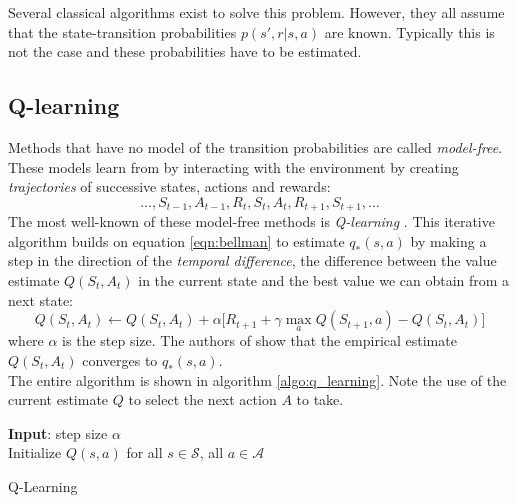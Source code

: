 Several classical algorithms exist to solve this problem. However, they all assume that the state-transition probabilities $p(s', r | s, a)$ are known. Typically this is not the case and these probabilities have to be estimated. 
\subsection{Q-learning}
\label{sec:intro_q_learning}
Methods that have no model of the transition probabilities are called \emph{model-free}. These models learn from by interacting with the environment by creating \emph{trajectories} of successive states, actions and rewards:
$$
\ldots, S_{t-1}, A_{t-1}, R_t, S_t, A_t, R_{t+1}, S_{t+1}, \ldots
$$
The most well-known of these  model-free methods is \emph{Q-learning} \cite{watkins1989learning}. This iterative algorithm builds on equation \ref{eqn:bellman} to estimate $q_{*}(s,a)$ by making a step in the direction of the \emph{temporal difference}, the difference between the value estimate $Q(S_t, A_t)$ in the current state and the best value we can obtain from a next state:
\begin{equation}
    Q(S_t, A_t) \leftarrow Q(S_t, A_t) + \alpha \big[R_{t+1} + \gamma \max_{a} Q(S_{t+1}, a) - Q(S_t, A_t) \big]
    \label{eqn:q_learning}
\end{equation}
where $\alpha$ is the step size. The authors of \cite{watkins1992q} show that the empirical estimate $Q(S_t, A_t)$ converges to $q_{*}(s,a)$.\\
The entire algorithm is shown in algorithm \ref{algo:q_learning}. Note the use of the current estimate $Q$ to select the next action $A$ to take.

\begin{algorithm}[H]
\SetAlgoLined
\textbf{Input}:  step size $\alpha$\\
Initialize $Q(s,a)$ for all $s \in \mathcal{S}$, all $a \in \mathcal{A}$\\
 \caption{Q-Learning}
 \label{algo:q_learning}
\end{algorithm}

